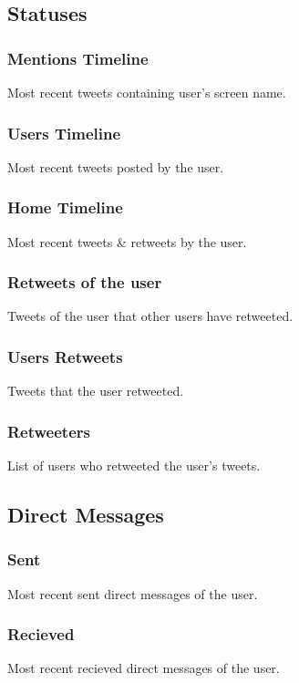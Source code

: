 \documentclass{article}
\begin{document}
	\subsection{Statuses}
		\subsubsection{Mentions Timeline}
			Most recent tweets containing user's screen name.
		
		\subsubsection{Users Timeline}
			Most recent tweets posted by the user.

		\subsubsection{Home Timeline}
			Most recent tweets \& retweets by the user.

		\subsubsection{Retweets of the user}
			Tweets of the user that other users have retweeted.

		\subsubsection{Users Retweets}
			Tweets that the user retweeted.

		\subsubsection{Retweeters}
			List of users who retweeted the user's tweets.

	\subsection{Direct Messages}
		\subsubsection{Sent}
			Most recent sent direct messages of the user.

		\subsubsection{Recieved}
			Most recent recieved direct messages of the user.
\end{document}
